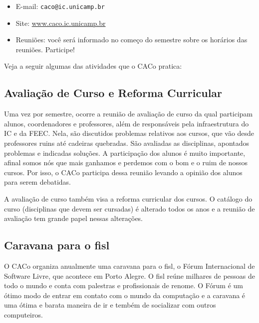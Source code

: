 \begin{itemize}
\item  E-mail: \texttt{caco@ic.unicamp.br}
\item  Site: \url{www.caco.ic.unicamp.br}
\item  Reuniões: você será informado no começo do semestre sobre os horários das reuniões. Participe!
\end{itemize}

Veja a seguir algumas das atividades que o CACo pratica:

\subsection{Avaliação de Curso e Reforma Curricular}

Uma vez por semestre, ocorre a reunião de avaliação de curso da qual participam
alunos, coordenadores e professores, além de responsáveis pela infraestrutura do
IC e da FEEC. Nela, são discutidos problemas relativos aos cursos, que vão desde
professores ruins até cadeiras quebradas. São avaliadas as disciplinas,
apontados problemas e indicadas soluções. A participação dos alunos é muito
importante, afinal somos nós que mais ganhamos e perdemos com o bom e o ruim de
nossos cursos. Por isso, o CACo participa dessa reunião levando a opinião dos
alunos para serem debatidas.

A avaliação de curso também visa a reforma curricular dos cursos. O catálogo do
curso (disciplinas que devem ser cursadas) é alterado todos os anos e a reunião
de avaliação tem grande papel nessas alterações.

\subsection{Caravana para o fisl}

O CACo organiza anualmente uma caravana para o fisl, o Fórum Internacional de
Software Livre, que acontece em Porto Alegre. O fisl reúne milhares de pessoas
de todo o mundo e conta com palestras e profissionais de renome. O Fórum é um
ótimo modo de entrar em contato com o mundo da computação e a caravana é uma
ótima e barata maneira de ir e tembém de socializar com outros computeiros.


